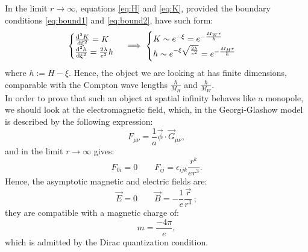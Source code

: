 \documentclass[main.tex]{subfiles}
\begin{document}
In the limit $r \to \infty$, equations \ref{eq:H} and \ref{eq:K}, provided the boundary conditions \ref{eq:bound1} and \ref{eq:bound2}, have such form: 
\begin{equation}
\begin{cases}
\dv[2]{K}{\xi}    = K    \\
\dv[2]{h}{\xi}   =  \frac{2 \lambda}{e^2} h \\
\end{cases}
\implies
\begin{cases}
K \sim e^{-\xi} = e^{- \frac{M_W r}{\hbar}}\\
h \sim e^{-\xi \sqrt{\frac{2 \lambda}{e^2}}} = e^{- \frac{M_H r}{\hbar}} \\
\end{cases}
\end{equation}
where $h:= H - \xi$.
Hence, the object we are looking at has finite dimensions, comparable with the Compton wave lengths $\frac{\hbar}{M_H}$ and $\frac{\hbar}{M_W}$. \\

In order to prove that such an object at spatial infinity behaves like a monopole, we should look at the electromagnetic field, which, in the Georgi-Glashow model is described by the following expression: 
\begin{equation}
 F_{\mu \nu} = \frac{1}{a} \vec{\phi} \cdot \vec{G}_{\mu \nu },
\end{equation}
and in the limit $r \to \infty$  gives:
\begin{equation}
F_{0i}= 0 \qquad F_{ij}= \epsilon_{ijk} \frac{r^k}{e r^3}.
\end{equation}
Hence, the asymptotic magnetic and electric fields are: 
\begin{equation}
\vec{E}=0 \qquad  \vec{B}= - \frac{1}{e} \frac{\vec{r}}{r^3}\,;
\end{equation}
they are compatible with a magnetic charge of: 
\begin{equation}
m= \frac{-4 \pi}{e},
\end{equation}
which is admitted by the Dirac quantization condition.

\end{document}
